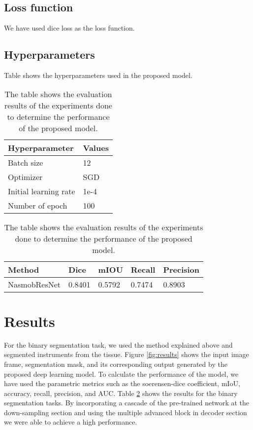 \documentclass[conference]{IEEEtran}
\begin{document}
\subsection{Loss function}
We have used dice loss as the loss function.

\subsection{Hyperparameters}
Table shows the hyperparameters used in the proposed model. 
\begin{table}[h]
\caption{The table shows the evaluation results of the experiments done to determine the performance of the proposed model.}
    \label{table:results}
    \def\arraystretch{1.5}
     \setlength\tabcolsep{10pt}
    \par\bigskip
    \centering
\begin{tabular}{|l|l|}
\hline
\textbf{Hyperparameter} & \textbf{Values} \\ \hline
Batch size & 12 \\ \hline
Optimizer & SGD \\ \hline
Initial learning rate & 1e-4 \\ \hline
Number of epoch & 100 \\ \hline
\end{tabular}
\end{table}
\begin{table}[h]
 \caption{The table shows the evaluation results of the experiments done to determine the performance of the proposed model.}
    \label{table:results}
    \def\arraystretch{1.5}
     \setlength\tabcolsep{10pt}
    \par\bigskip
    \centering
  \begin{tabular}{|l|l|l|l|l|}
\hline
\textbf{Method } & \textbf{Dice} & \textbf{mIOU} & \textbf{Recall} & \textbf{Precision}  \\ \hline
NasmobResNet & 0.8401 & 0.5792 & 0.7474   & 0.8903 \\ \hline
\end{tabular}
\end{table} 
\section{Results}
For the binary segmentation task, we used the method explained above and segmented instruments from the tissue. Figure \ref{fig:results} shows the input image frame, segmentation mask, and its corresponding output generated by the proposed deep learning model. To calculate the performance of the model, we have used the parametric metrics such as the soerensen-dice coefficient, \ac{mIoU}, accuracy, recall, precision, and \ac{AUC}. Table \ref{table:results} shows the results for the binary segmentation tasks. By incorporating a cascade of the pre-trained network at the down-sampling section and using the multiple advanced block in decoder section we were able to achieve a high performance. 
\end{document}
